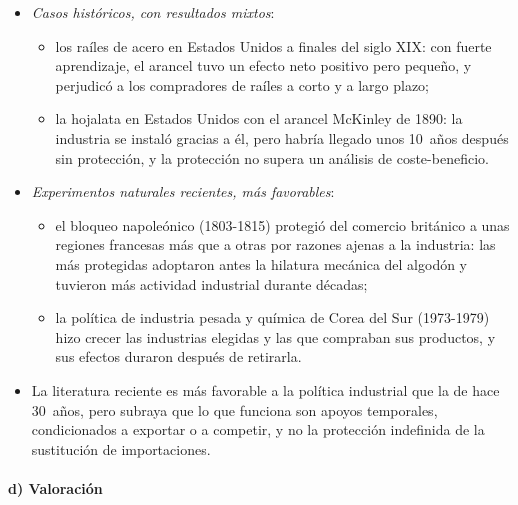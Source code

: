 \documentclass[11pt]{article}
\begin{document}
\begin{itemize}
\item \emph{Casos históricos, con resultados mixtos}:
  \begin{itemize}
  \item los raíles de acero en Estados Unidos a finales del siglo XIX: con fuerte aprendizaje, el arancel tuvo un efecto neto positivo pero pequeño, y perjudicó a los compradores de raíles a corto y a largo plazo\nocite{Head1994Infant};
  \item la hojalata en Estados Unidos con el arancel McKinley de 1890: la industria se instaló gracias a él, pero habría llegado unos 10~años después sin protección, y la protección no supera un análisis de coste-beneficio\nocite{Irwin2000Did}.
  \end{itemize}
\item \emph{Experimentos naturales recientes, más favorables}:
  \begin{itemize}
  \item el bloqueo napoleónico (1803-1815) protegió del comercio británico a unas regiones francesas más que a otras por razones ajenas a la industria: las más protegidas adoptaron antes la hilatura mecánica del algodón y tuvieron más actividad industrial durante décadas\nocite{Juhasz2018Temporary};
  \item la política de industria pesada y química de Corea del Sur (1973-1979) hizo crecer las industrias elegidas y las que compraban sus productos, y sus efectos duraron después de retirarla\nocite{Lane2025Manufacturing}.
  \end{itemize}
\item La literatura reciente es más favorable a la política industrial que la de hace 30~años, pero subraya que lo que funciona son apoyos temporales, condicionados a exportar o a competir, y no la protección indefinida de la sustitución de importaciones\nocite{HarrisonRodriguezClare2010Trade,JuhaszLaneRodrik2024}.
\end{itemize}

\paragraph{d) Valoración}
\end{document}
